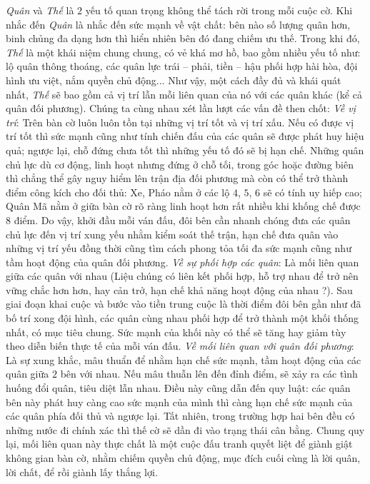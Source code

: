 \begin{multicols}{2}
	\textit{Quân} và \textit{Thế} là $2$ yếu tố quan trọng không thể tách rời trong mỗi cuộc cờ. Khi nhắc đến \textit{Quân} là nhắc đến sức mạnh về vật chất: bên nào số lượng quân hơn, binh chủng đa dạng hơn thì hiển nhiên bên đó đang chiếm ưu thế. Trong khi đó, \textit{Thế} là một khái niệm chung chung, có vẻ khá mơ hồ, bao gồm nhiều yếu tố như: lộ quân thông thoáng, các quân lực trái -- phải, tiền -- hậu phối hợp hài hòa, đội hình ưu việt, nắm quyền chủ động... Như vậy, một cách đầy đủ và khái quát nhất, \textit{Thế} sẽ bao gồm cả vị trí lẫn mỗi liên quan của nó với các quân khác (kể cả quân đối phương). Chúng ta cùng nhau xét lần lượt các vấn đề then chốt:
	\vskip 0.1cm
	\textit{Về vị trí}: Trên bàn cờ luôn luôn tồn tại những vị trí tốt và vị trí xấu. Nếu có được vị trí tốt thì sức mạnh cũng như tính chiến đấu của các quân sẽ được phát huy hiệu quả; ngược lại, chỗ đứng chưa tốt thì những yếu tố đó sẽ bị hạn chế. Những quân chủ lực dù cơ động, linh hoạt nhưng đứng ở chỗ tối, trong góc hoặc đường biên thì chẳng thể gây nguy hiểm lên trận địa đối phương mà còn có thể trở thành điểm công kích cho đối thủ: Xe, Pháo nằm ở các lộ $4$, $5$, $6$ sẽ có tính uy hiếp cao;  Quân Mã nằm ở giữa bàn cờ rõ ràng linh hoạt hơn rất nhiều khi khống chế được 8 điểm. Do vậy, khởi đầu mỗi ván đấu, đôi bên cần nhanh chóng đưa các quân chủ lực đến vị trí xung yếu nhằm kiểm soát thế trận, hạn chế đưa quân vào những vị trí yếu đồng thời cũng tìm cách phong tỏa tối đa sức mạnh cũng như tầm hoạt động của quân đối phương.
	\vskip 0.1cm
	\textit{Về sự phối hợp các quân}: Là mối liên quan giữa các quân với nhau (Liệu chúng có liên kết phối hợp, hỗ trợ nhau để trở nên vững chắc hơn hơn, hay cản trở, hạn chế khả năng hoạt động của nhau ?). Sau giai đoạn khai cuộc và bước vào tiền trung cuộc là thời điểm đôi bên gần như đã bố trí xong đội hình, các quân cùng nhau phối hợp để trở thành một khối thống nhất, có mục tiêu chung. Sức mạnh của khối này có thể sẽ tăng hay giảm tùy theo diễn biến thực tế của mỗi ván đấu.
	\vskip 0.1cm
	\textit{Về mối liên quan với quân đối phương}: Là sự xung khắc, mâu thuẩn để nhằm hạn chế sức mạnh, tầm hoạt động của các quân giữa $2$ bên với nhau. Nếu mâu thuẫn lên đến đỉnh điểm, sẽ xảy ra các tình huống đổi quân, tiêu diệt lẫn nhau. Điều này cũng dẫn đến quy luật: các quân bên này phát huy càng cao sức mạnh của mình thì càng hạn chế sức mạnh của các quân phía đối thủ và ngược lại. Tất nhiên, trong trường hợp hai bên đều có những nước đi chính xác thì thế cờ sẽ dần đi vào trạng thái cân bằng. Chung quy lại, mối liên quan này thực chất là một cuộc đấu tranh quyết liệt để giành giật không gian bàn cờ, nhằm chiếm quyền chủ động, mục đích cuối cùng là lời quân, lời chất, để rồi giành lấy thắng lợi.

\end{multicols}
